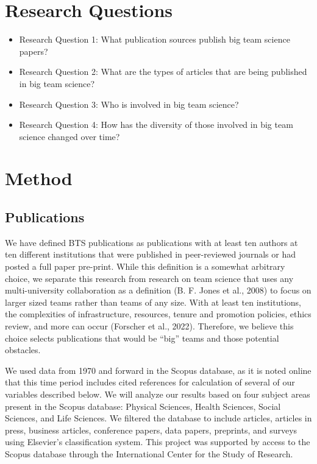 \documentclass[
  man,mask,floatsintext]{apa7}
\providecommand{\tightlist}{%
  \setlength{\itemsep}{0pt}\setlength{\parskip}{0pt}}
\begin{document}
\hypertarget{research-questions}{%
\section{Research Questions}\label{research-questions}}

\begin{itemize}
\tightlist
\item
  Research Question 1: What publication sources publish big team
  science papers?
\item
  Research Question 2: What are the types of articles that are being
  published in big team science?
\item
  Research Question 3: Who is involved in big team science?
\item
  Research Question 4: How has the diversity of those involved in big team science changed over time?
\end{itemize}

\hypertarget{method}{%
\section{Method}\label{method}}

\hypertarget{publications}{%
\subsection{Publications}\label{publications}}

We have defined BTS publications as publications with at least ten
authors at ten different institutions that were published in
peer-reviewed journals or had posted a full paper pre-print. While this
definition is a somewhat arbitrary choice, we separate this research
from research on team science that uses any multi-university collaboration
as a definition (B. F. Jones et al., 2008) to focus on larger sized teams rather
than teams of any size. With at least ten institutions, the complexities
of infrastructure, resources, tenure and promotion policies, ethics review, and more can occur (Forscher et al., 2022). Therefore, we believe this choice selects publications that would be ``big'' teams and those potential obstacles.

We used
data from 1970 and forward in the Scopus database, as it is noted online
that this time period includes cited references for calculation of
several of our variables described below. We will analyze our results
based on four subject areas present in the Scopus database: Physical
Sciences, Health Sciences, Social Sciences, and Life Sciences. We
filtered the database to include articles, articles in press, business
articles, conference papers, data papers, preprints, and surveys using
Elsevier's classification system. This project was supported by access
to the Scopus database through the International Center for the Study of
Research.
\end{document}

